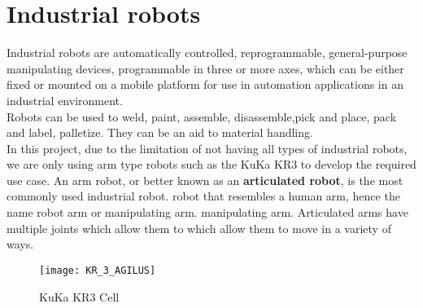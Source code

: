 \section{Industrial robots}

Industrial robots are automatically controlled, 
reprogrammable, general-purpose manipulating devices, 
programmable in three or more axes, 
which can be either fixed or mounted on a mobile 
platform for use in automation applications in an industrial 
environment.\cite{dagalakis1999industrial}\\
Robots can be used to weld, paint, assemble, 
disassemble,pick and place, pack and label, 
palletize.\cite{hagele2016industrial}
They can be an aid to material handling.\cite{hagele2016industrial}
\\In this project, due to the limitation of not having all types of industrial robots, we are only using arm type robots such as the KuKa KR3 to develop the required use case.
An arm robot, or better known as an \textbf{articulated robot}, is the most commonly used industrial robot. 
robot that resembles a human arm, hence the name robot arm or manipulating arm. 
manipulating arm. Articulated arms have multiple joints which allow them to 
which allow them to move in a variety of ways.\cite{hagele2016industrial}
\\
\begin{figure}[h]
    \centering
    \texttt{[image: KR\_3\_AGILUS]}
    \caption{KuKa KR3 Cell}
    \label{fig:mesh4}
\end{figure}
